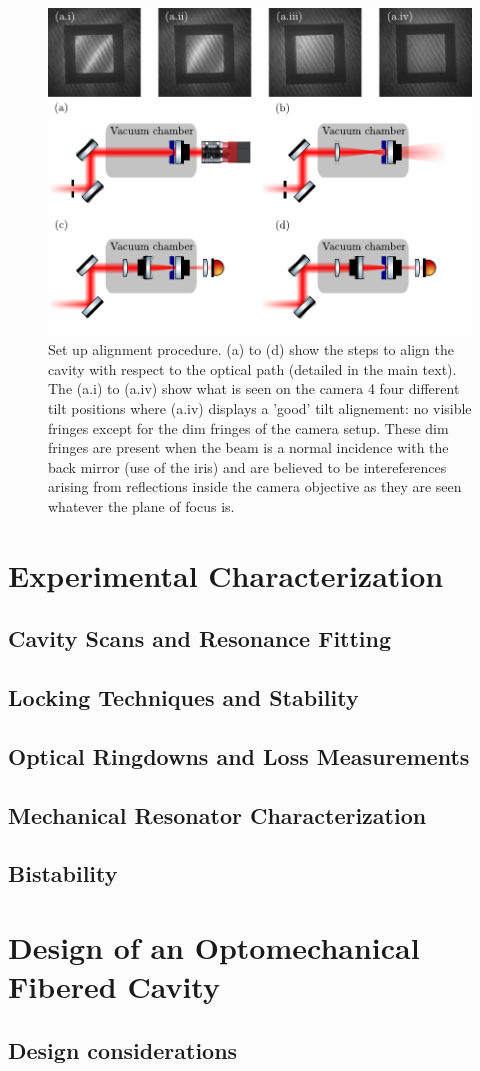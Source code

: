 \begin{figure}[h!]
    \centering  
    \includegraphics[width=\textwidth]{./chap5/fig/tilt_alignementB.pdf}
    \caption{Set up alignment procedure. (a) to (d) show the steps to align the cavity with respect to the optical path (detailed in the main text). The (a.i) to (a.iv) show what is seen on the camera 4 four different tilt positions where (a.iv) displays a 'good' tilt alignement: no visible fringes except for the dim fringes of the camera setup. These dim fringes are present when the beam is a normal incidence with the back mirror (use of the iris) and are believed to be intereferences arising from reflections inside the camera objective as they are seen whatever the plane of focus is. }
    \label{fig:tilt}
\end{figure}
\section{Experimental Characterization}
\subsection{Cavity Scans and Resonance Fitting}
\subsection{Locking Techniques and Stability}
\subsection{Optical Ringdowns and Loss Measurements}
\subsection{Mechanical Resonator Characterization}
\subsection{Bistability}

\section{Design of an Optomechanical Fibered Cavity}
\subsection{Design considerations}

\vspace{-\baselineskip}

